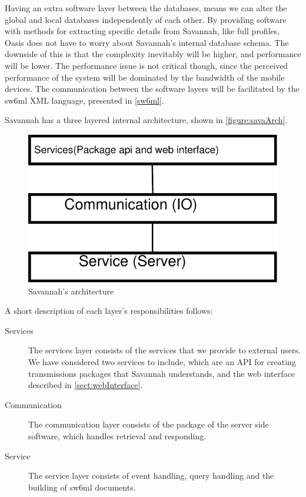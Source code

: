 Having an extra software layer between the databases, means we can alter the global and local databases independently of each other. By providing software with methods for extracting specific
details from Savannah, like full profiles, Oasis does not have to worry about Savannah's internal database schema. The downside of this is that the complexity inevitably will be higher, and performance
will be lower. The performance issue is not critical though, since the perceived performance of the system will be dominated by the bandwidth of the mobile devices. 
The communication between the software layers will be facilitated by the sw6ml XML language, presented in \autoref{sw6ml}.

Savannah has a three layered internal architecture, shown in \autoref{figure:savaArch}.

\begin{figure}[H]
  \centering
    \includegraphics{images/savaArch}
  \caption{Savannah's architecture}
  \label{figure:savaArch}
\end{figure}

A short description of each layer's responsibilities follows:

\begin{description}
 \item[Services] The services layer consists of the services that we provide to external users. We have considered two services to include, which are an API for creating transmissions packages	 		that Savannah understands, and the web interface described in \autoref{sect:webInterface}.
 \item[Communication] The communication layer consists of the  package of the server side software, which handles retrieval and responding.
 \item[Service] The service layer consists of event handling, query handling and the building of sw6ml documents.
\end{description}


